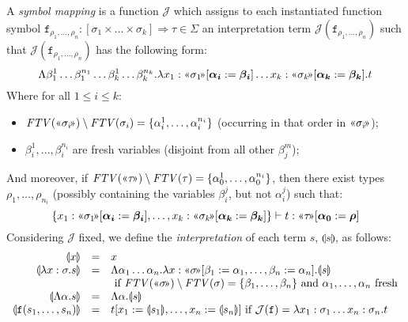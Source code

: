 \documentclass[runningheads,a4paper]{llncs}
\newcommand{\Termmap}{\mathcal{J}}
\newcommand{\typeinterpret}[1]{\text{\guillemotleft} #1\! \text{\guillemotright}}
\newcommand{\interpret}[1]{\llparenthesis #1 \rrparenthesis}
\newcommand{\arrtype}{\Rightarrow}
\newcommand{\abs}[2]{\lambda #1.#2}
\newcommand{\tabs}[2]{\Lambda #1.#2}
\newcommand{\FTV}{\mathit{FTV}}
\begin{document}
\begin{definition}
A \emph{symbol mapping} is a function $\Termmap$ which assigns to each
instantiated function symbol $\mathtt{f}_{\rho_1,\dots,\rho_n} :
[\sigma_1 \times \dots \times \sigma_k] \arrtype \tau \in \Sigma$ an
interpretation term $\Termmap(\mathtt{f}_{\rho_1,\dots,\rho_n})$ such
that $\Termmap(\mathtt{f}_{\rho_1,\dots,\rho_n})$ has the following
form:
\[
\tabs{\beta_1^1 \dots \beta_1^{n_1} \dots \beta_k^1 \dots \beta_k^{n_k}}{
\abs{x_1:\typeinterpret{\sigma_1}[\vec{\alpha_i}:=\vec{\beta_i}] \dots
x_k:\typeinterpret{\sigma_k}[\vec{\alpha_k}:=\vec{\beta_k}]}{t}}
\]
Where for all $1 \leq i \leq k$:
\begin{itemize}
\item $\FTV(\typeinterpret{\sigma_i}) \setminus \FTV(\sigma_i) =
  \{ \alpha_i^1,\dots,\alpha_i^{n_i} \}$ (occurring in that order in
  $\typeinterpret{\sigma_i}$);
\item $\beta_i^1,\dots,\beta_i^{n_i}$ are fresh variables (disjoint
    from all other $\beta_j^m$);
\end{itemize}
And moreover, if $\FTV(\typeinterpret{\tau}) \setminus \FTV(\tau) =
\{ \alpha_0^1,\dots,\alpha_0^{n_i} \}$, then there exist types
$\rho_1,\dots,\rho_{n_i}$ (possibly containing the variables
$\beta_i^j$, but not $\alpha_i^j$) such that:
\[
\{ x_1 : \typeinterpret{\sigma_1}[\vec{\alpha_i}:=\vec{\beta_i}],
\dots, x_k : \typeinterpret{\sigma_k}[\vec{\alpha_k}:=\vec{\beta_k}]
\} \vdash t : \typeinterpret{\tau}[\vec{\alpha_0}:=\vec{\rho}]
\]
Considering $\Termmap$ fixed, we define the \emph{interpretation} of
each term $s$, $\interpret{s}$, as follows:
\[
\begin{array}{rcl}
\interpret{x} & = & x \\
\interpret{\abs{x:\sigma}{s}} & = & \tabs{\alpha_1 \dots \alpha_n}{
  \abs{x:\typeinterpret{\sigma}[\beta_1:=\alpha_1,\dots,\beta_n:=
  \alpha_n]}{\interpret{s}}} \\
  & & \ \hfill
  \text{if}\ \FTV(\typeinterpret{\sigma}) \setminus \FTV(\sigma) =
  \{ \beta_1,\dots,\beta_n \}\ \text{and}\ \alpha_1,\dots,\alpha_n\ 
  \text{fresh} \\
\interpret{\tabs{\alpha}{s}} & = & \tabs{\alpha}{\interpret{s}} \\
\interpret{\mathtt{f}(s_1,\dots,s_n)} & = &
  t[x_1:=\interpret{s_1},\dots,x_n:=\interpret{s_n}]\ \text{if}\ 
  \Termmap(\mathtt{f}) = \abs{x_1:\sigma_1 \dots x_n:\sigma_n}{t} \\
\end{array}
\]
\end{definition}
\end{document}

